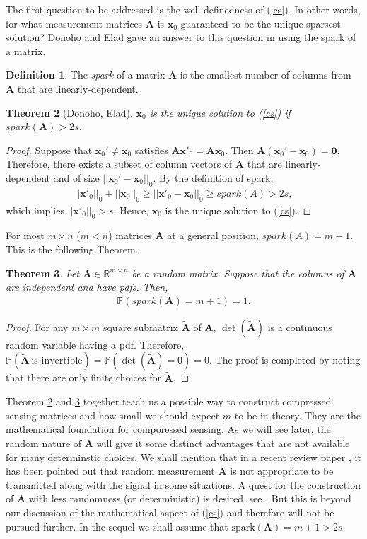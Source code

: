 \documentclass[11pt]{article}
\numberwithin{equation}{section}
\theoremstyle{plain}
\newtheorem{Th}{Theorem}[section]
\theoremstyle{definition}
\newtheorem{Def}[Th]{Definition}
\def\R{{\mathbb R}}
\def\R{{\mathbb R}}
\def\P{{\mathbb P}}
\def\A{{\mathbf A}}
\def\x{{\mathbf x}}
\begin{document}
The first question to be addressed is the well-definedness of (\ref{cs}). In other words, for what measurement matrices $\A$ is $\x_0$ guaranteed to be the unique sparsest solution? Donoho and Elad gave an answer to this question in \cite{donoho2003optimally} using the spark of a matrix. 

\begin{Def}
The \emph{spark} of a matrix $\A$ is the smallest number of columns from $\A$ that are linearly-dependent. 
\end{Def}

\begin{Th}[Donoho, Elad]\label{spark}
$\x_0$ is the unique solution to (\ref{cs}) if $spark(\A)>2s$. 
\end{Th}
\begin{proof}
Suppose that $\x_0'\neq\x_0$ satisfies $\A\x'_0=\A\x_0$. Then $\A(\x_0'-\x_0)=\mathbf{0}$. Therefore, there exists a subset of column vectors of $\A$ that are linearly-dependent and of size $||\x_0'-\x_0||_0$. By the definition of spark, 
\begin{align*}
||\x'_0||_0+||\x_0||_0\geq ||\x'_0-\x_0||_0\geq spark(A)>2s, 
\end{align*}
which implies $||\x'_0||_0>s$. Hence, $\x_0$ is the unique solution to (\ref{cs}).   
\end{proof}
For most $m\times n$ ($m<n$) matrices $\A$ at a general position, $spark(A)=m+1$. This is the following Theorem. 
\begin{Th}\label{random mesurement}
Let $\A\in\R^{m\times n}$ be a random matrix. Suppose that the columns of $\A$ are independent and have pdfs. Then, 
\begin{align*}
\P\left(spark(\A)=m+1\right)=1. 
\end{align*}
\end{Th} 
\begin{proof}
For any $m\times m$ square submatrix $\tilde{\A}$ of $\A$, $\det(\tilde{\A})$ is a continuous random variable having a pdf. Therefore, $\P(\tilde{\A}\ \text{is\ invertible})=\P(\det(\tilde{\A})=0)=0$. The proof is completed by noting that there are only finite choices for $\tilde{\A}$. 
\end{proof}

Theorem \ref{spark} and \ref{random mesurement} together teach us a possible way to construct compressed sensing matrices and how small we should expect $m$ to be in theory. They are the mathematical foundation for comporessed sensing. As we will see later, the random nature of $\A$ will give it some distinct advantages that are not available for many determinstic choices. We shall mention that in a recent review paper \cite{rani2018systematic}, it has been pointed out that random measurement $\A$ is not appropriate to be transmitted  along with the signal in some situations. A quest for the construction of $\A$ with less randomness (or deterministic) is desired, see \cite{kasiviswanathan2019restricted}. But this is beyond our discussion of the mathematical aspect of (\ref{cs}) and therefore will not be pursued further. In the sequel we shall assume that $\text{spark}(\A)=m+1>2s$. 
 
\end{document}
